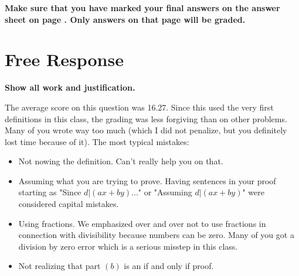 \documentclass[12pt]{article}
\begin{document}
\begin{center}
\textbf{Make sure that you have marked your final answers on the answer sheet on page \pageref{answersheet}. Only answers on that page will be graded.}
\end{center}
\newpage
\section*{Free Response}

\textbf{Show all work and justification.} 

The average score on this question was 16.27. Since this used the very first definitions in this class, the grading was less forgiving than on other problems. Many of you wrote way too much (which I did not penalize, but you definitely lost time because of it). The most typical mistakes:
\begin{itemize}
\item Not nowing the definition. Can't really help you on that.
\item Assuming what you are trying to prove. Having sentences in your proof starting as "Since $d|(ax+by)$..." or "Assuming $d|(ax+by)$" were considered capital mistakes.
\item Using fractions. We emphasized over and over not to use fractions in connection with divisibility because numbers can be zero. Many of you got a division by zero error which is a serious misstep in this class.
\item Not realizing that part $(b)$ is an if and only if proof.
\end{itemize}
\end{document}
